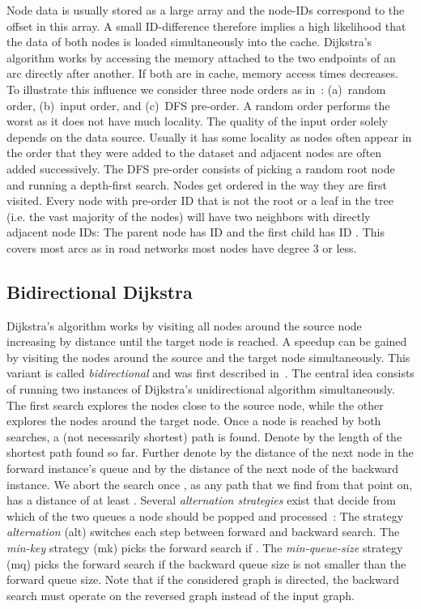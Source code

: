 \documentclass{sig-alternate}
\begin{document}
Node data is usually stored as a large array and the node-IDs correspond
to the offset in this array. A small ID-difference therefore implies
a high likelihood that the data of both nodes is loaded simultaneously into the cache. Dijkstra's
algorithm works by accessing the memory attached to the two endpoints
of an arc directly after another. If both are in cache, memory access times decreases. To illustrate this influence
we consider three node orders as in~\cite{dgnw-phast-13}: (a)~random order, (b)~input order, and
(c)~DFS pre-order. A random order performs the worst as it does not have much locality. The quality of the input order solely depends
on the data source. Usually it has some locality as nodes often appear
in the order that they were added to the dataset and adjacent nodes
are often added successively. The DFS pre-order consists of picking
a random root node and running a depth-first search. Nodes get ordered
in the way they are first visited. Every node with pre-order ID 
that is not the root or a leaf in the tree (i.e. the vast majority
of the nodes) will have two neighbors with directly adjacent node
IDs: The parent node has ID  and the first child has ID .
This covers most arcs as in road networks most nodes have degree 3 or less.




\subsection{Bidirectional Dijkstra}

Dijkstra's algorithm works by visiting all nodes around the source
node increasing by distance until the target node is reached. A speedup
can be gained by visiting the nodes around the source and the target
node simultaneously. This variant is called \emph{bidirectional} and
was first described in~\cite{d-lpe-62}. The central idea consists
of running two instances of Dijkstra's unidirectional algorithm simultaneously.
The first search explores the nodes close to the source node, while
the other explores the nodes around the target node. Once a node is
reached by both searches, a (not necessarily shortest) path is found.
Denote by  the length of the shortest path found so far. Further
denote by  the distance of the next node in the forward instance's
queue and by  the distance of the next node of the backward
instance. We abort the search once , as any path
that we find from that point on, has a distance of at least
. Several \emph{alternation strategies} exist that decide from
which of the two queues a node should be popped and processed~\cite{p-bs-71,ww-sutsp-07}:
The strategy \emph{alternation} (alt) switches each step between forward
and backward search. The \emph{min-key} strategy (mk) picks the forward
search if . The \emph{min-queue-size} strategy (mq)
picks the forward search if the backward queue size is not smaller
than the forward queue size. 
Note that if the considered graph is directed, the backward search must operate on the reversed graph instead of the input graph. 
\end{document}
